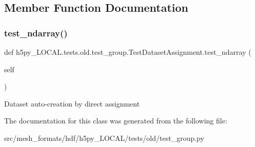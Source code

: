 \subsection{Member Function Documentation}
\mbox{\label{classh5py__LOCAL_1_1tests_1_1old_1_1test__group_1_1TestDatasetAssignment_ab5e8ed1f0205f9ece2e036d8fea155c1}} 
\subsubsection{\texorpdfstring{test\+\_\+ndarray()}{test\_ndarray()}}
{\footnotesize\ttfamily def h5py\+\_\+\+L\+O\+C\+A\+L.\+tests.\+old.\+test\+\_\+group.\+Test\+Dataset\+Assignment.\+test\+\_\+ndarray (\begin{DoxyParamCaption}\item[{}]{self }\end{DoxyParamCaption})}

\begin{DoxyVerb}Dataset auto-creation by direct assignment \end{DoxyVerb}
 

The documentation for this class was generated from the following file\+:\begin{DoxyCompactItemize}
\item 
src/mesh\+\_\+formats/hdf/h5py\+\_\+\+L\+O\+C\+A\+L/tests/old/test\+\_\+group.\+py\end{DoxyCompactItemize}
